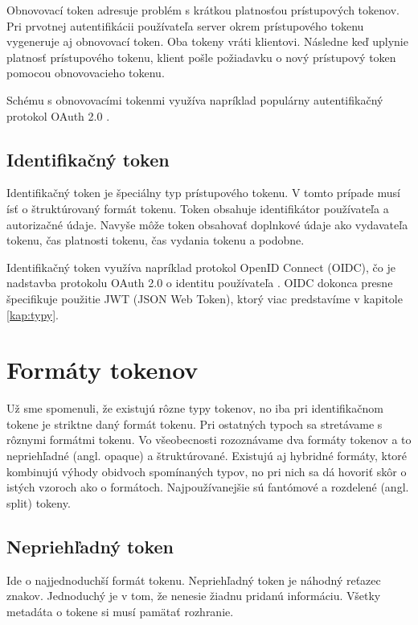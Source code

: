 Obnovovací token adresuje problém s krátkou platnosťou prístupových tokenov. Pri prvotnej autentifikácii používateľa server okrem prístupového tokenu vygeneruje aj obnovovací token. Oba tokeny vráti klientovi. Následne keď uplynie platnosť prístupového tokenu, klient pošle požiadavku o nový prístupový token pomocou obnovovacieho tokenu. 

Schému s obnovovacími tokenmi využíva napríklad populárny autentifikačný protokol OAuth 2.0 \cite{oauth2}.


\subsection{Identifikačný token}

Identifikačný token je špeciálny typ prístupového tokenu. V tomto prípade musí ísť o štruktúrovaný formát tokenu. Token obsahuje identifikátor používateľa a autorizačné údaje. Navyše môže token obsahovať doplnkové údaje ako vydavateľa tokenu, čas platnosti tokenu, čas vydania tokenu a podobne.

Identifikačný token využíva napríklad protokol OpenID Connect (OIDC), čo je nadstavba protokolu OAuth 2.0 o identitu používateľa \cite{oidc}. OIDC dokonca presne špecifikuje použitie JWT (JSON Web Token), ktorý viac predstavíme v kapitole \ref{kap:typy}.


\section{Formáty tokenov}
\label{sec:formats}

Už sme spomenuli, že existujú rôzne typy tokenov, no iba pri identifikačnom tokene je striktne daný formát tokenu. Pri ostatných typoch sa stretávame s rôznymi formátmi tokenu. Vo všeobecnosti rozoznávame dva formáty tokenov a to nepriehľadné (angl. opaque) a štruktúrované. Existujú aj hybridné formáty, ktoré kombinujú výhody obidvoch spomínaných typov, no pri nich sa dá hovoriť skôr o istých vzoroch ako o formátoch. Najpoužívanejšie sú fantómové a rozdelené (angl. split) tokeny. 

\subsection{Nepriehľadný token}
\label{sec:opaque}

Ide o najjednoduchší formát tokenu. Nepriehľadný token je náhodný reťazec znakov. Jednoduchý je v tom, že nenesie žiadnu pridanú informáciu. Všetky metadáta o tokene si musí pamätať rozhranie.

